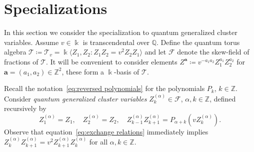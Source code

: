 \documentclass[ALCO,ThmDefs,Unicode,epreuves]{cedram}
\newcommand{\bfa}{\mathbf{a}}
\newcommand{\cF}{\mathcal{F}}
\newcommand{\cT}{\mathcal{T}}
\newcommand{\kk}{\Bbbk}
\newcommand{\QQ}{\mathbb{Q}}
\newcommand{\ZZ}{\mathbb{Z}}
\begin{document}
\section{Specializations}
\label{sec:specialization}

\noindent
In this section we consider the specialization to quantum generalized cluster variables.
Assume $v\in\kk$ is transcendental over $\QQ$.
Define the quantum torus algebra $\cT\coloneqq \cT_v=\kk\langle Z_1,Z_2:Z_1Z_2=v^2Z_2Z_1\rangle$ and let $\cF$ denote the skew-field of fractions of $\cT$.
It will be convenient to consider elements $Z^\bfa\coloneqq v^{-a_1a_2}Z_1^{a_1}Z_2^{a_2}$ for $\bfa=(a_1,a_2)\in\ZZ^2$, these form a $\kk$-basis of $\cT$.

Recall the notation~\eqref{eq:reversed polynomials} for the polynomials $P_k$, $k\in\ZZ$.
Consider \emph{quantum generalized cluster variables} $Z^{(\alpha)}_k\in\cF$, $\alpha,k\in\ZZ$, defined recursively by
\begin{equation}
 \label{eq:exchange relations}
 Z^{(\alpha)}_1=Z_1,\quad Z^{(\alpha)}_2=Z_2,\quad Z^{(\alpha)}_{k-1}Z^{(\alpha)}_{k+1}=P_{\alpha+k}(vZ^{(\alpha)}_k).
\end{equation}
Observe that equation~\eqref{eq:exchange relations} immediately implies $Z^{(\alpha)}_kZ^{(\alpha)}_{k+1}=v^2Z^{(\alpha)}_{k+1}Z^{(\alpha)}_k$ for all \hbox{$\alpha,k\in\ZZ$}.
\end{document}
